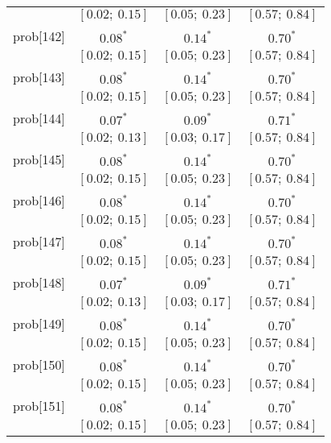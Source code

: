 \begin{table}
\begin{center}
\begin{tabular}{l c c c }
          & $[0.02;\ 0.15]$         & $[0.05;\ 0.23]$         & $[0.57;\ 0.84]$       \\
prob[142] & $0.08^{*}$              & $0.14^{*}$              & $0.70^{*}$            \\
          & $[0.02;\ 0.15]$         & $[0.05;\ 0.23]$         & $[0.57;\ 0.84]$       \\
prob[143] & $0.08^{*}$              & $0.14^{*}$              & $0.70^{*}$            \\
          & $[0.02;\ 0.15]$         & $[0.05;\ 0.23]$         & $[0.57;\ 0.84]$       \\
prob[144] & $0.07^{*}$              & $0.09^{*}$              & $0.71^{*}$            \\
          & $[0.02;\ 0.13]$         & $[0.03;\ 0.17]$         & $[0.57;\ 0.84]$       \\
prob[145] & $0.08^{*}$              & $0.14^{*}$              & $0.70^{*}$            \\
          & $[0.02;\ 0.15]$         & $[0.05;\ 0.23]$         & $[0.57;\ 0.84]$       \\
prob[146] & $0.08^{*}$              & $0.14^{*}$              & $0.70^{*}$            \\
          & $[0.02;\ 0.15]$         & $[0.05;\ 0.23]$         & $[0.57;\ 0.84]$       \\
prob[147] & $0.08^{*}$              & $0.14^{*}$              & $0.70^{*}$            \\
          & $[0.02;\ 0.15]$         & $[0.05;\ 0.23]$         & $[0.57;\ 0.84]$       \\
prob[148] & $0.07^{*}$              & $0.09^{*}$              & $0.71^{*}$            \\
          & $[0.02;\ 0.13]$         & $[0.03;\ 0.17]$         & $[0.57;\ 0.84]$       \\
prob[149] & $0.08^{*}$              & $0.14^{*}$              & $0.70^{*}$            \\
          & $[0.02;\ 0.15]$         & $[0.05;\ 0.23]$         & $[0.57;\ 0.84]$       \\
prob[150] & $0.08^{*}$              & $0.14^{*}$              & $0.70^{*}$            \\
          & $[0.02;\ 0.15]$         & $[0.05;\ 0.23]$         & $[0.57;\ 0.84]$       \\
prob[151] & $0.08^{*}$              & $0.14^{*}$              & $0.70^{*}$            \\
          & $[0.02;\ 0.15]$         & $[0.05;\ 0.23]$         & $[0.57;\ 0.84]$       \\

\end{tabular}
\end{center}
\end{table}
